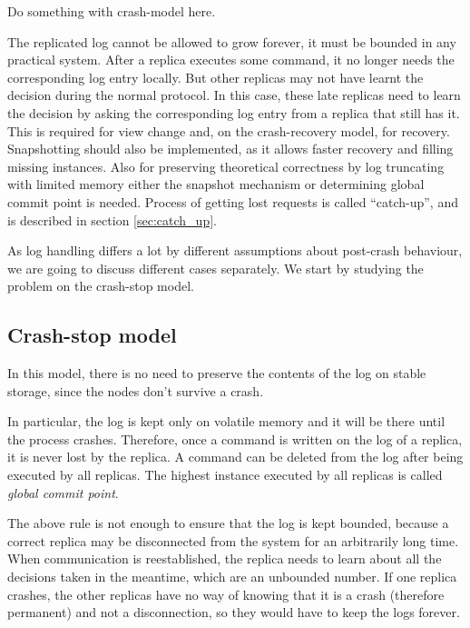 \begin{TODO}
  Do something with crash-model here.
\end{TODO}

The replicated log cannot be allowed to grow forever, it must be bounded in any practical system. After a replica executes some command, it no longer needs the corresponding log entry locally. But other replicas may not have learnt the decision during the normal protocol. In this case, these late replicas need to learn the decision by asking the corresponding log entry from a replica that still has it. This is required for view change and, on the crash-recovery model, for recovery. Snapshotting should also be implemented, as it allows faster recovery and filling missing instances. Also for preserving theoretical correctness by log truncating with limited memory either the snapshot mechanism or determining global commit point is needed. Process of getting lost requests is called ``catch-up'', and is described in section \ref{sec:catch_up}.

As log handling differs a lot by different assumptions about post-crash behaviour, we are going to discuss different cases separately.
We start by studying the problem on the crash-stop model.

\subsection{Crash-stop model}
\label{subsec:crash_stop_model}
In this model, there is no need to preserve the contents of the log on stable storage, since the nodes don't survive a crash.

In particular, the log is kept only on volatile memory and it will be there until the process crashes. Therefore, once a command is written on the log of a replica, it is never lost by the replica. A command can be deleted from the log after being executed by all replicas. The highest instance executed by all replicas is called \emph{global commit point}.

The above rule is not enough to ensure that the log is kept bounded, because a correct replica may be disconnected from the system for an arbitrarily long time. When communication is reestablished, the replica needs to learn about all the decisions taken in the meantime, which are an unbounded number. If one replica crashes, the other replicas have no way of knowing that it is a crash (therefore permanent) and not a disconnection, so they would have to keep the logs forever.

